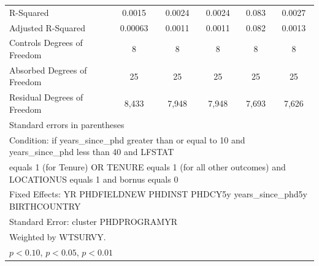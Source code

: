 \begin{table}[htbp]
\begin{tabular}{l*{5}{c}}
R-Squared&      0.0015         &      0.0024         &      0.0024         &       0.083         &      0.0027         \\
Adjusted R-Squared&     0.00063         &      0.0011         &      0.0011         &       0.082         &      0.0013         \\
Controls Degrees of Freedom&           8         &           8         &           8         &           8         &           8         \\
Absorbed Degrees of Freedom&          25         &          25         &          25         &          25         &          25         \\
Residual Degrees of Freedom&       8,433         &       7,948         &       7,948         &       7,693         &       7,626         \\
\hline\hline
\multicolumn{6}{l}{\footnotesize Standard errors in parentheses}\\
\multicolumn{6}{l}{\footnotesize Condition: if years\_since\_phd greater than or equal to 10 and years\_since\_phd less than 40 and LFSTAT}\\
\multicolumn{6}{l}{\footnotesize equals 1 (for Tenure) OR TENURE equals 1 (for all other outcomes) and LOCATIONUS equals 1 and bornus equals 0}\\
\multicolumn{6}{l}{\footnotesize Fixed Effects: YR PHDFIELDNEW PHDINST PHDCY5y years\_since\_phd5y BIRTHCOUNTRY}\\
\multicolumn{6}{l}{\footnotesize Standard Error: cluster PHDPROGRAMYR}\\
\multicolumn{6}{l}{\footnotesize Weighted by WTSURVY.}\\
\multicolumn{6}{l}{\footnotesize \sym{*} \(p<0.10\), \sym{**} \(p<0.05\), \sym{***} \(p<0.01\)}\\
\end{tabular}
\end{table}
